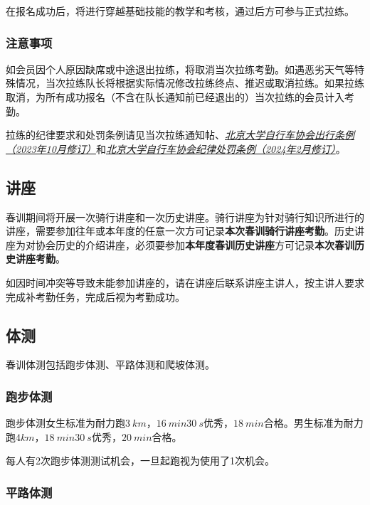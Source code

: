 \documentclass[UTF8]{ctexart}
\begin{document}
在报名成功后，将进行穿越基础技能的教学和考核，通过后方可参与正式拉练。

\subsubsection{注意事项}

如会员因个人原因缺席或中途退出拉练，将取消当次拉练考勤。如遇恶劣天气等特殊情况，当次拉练队长将根据实际情况修改拉练终点、推迟或取消拉练。如果拉练取消，为所有成功报名（不含在队长通知前已经退出的）当次拉练的会员计入考勤。


拉练的纪律要求和处罚条例请见当次拉练通知帖、\href{https://chexie.net/bbs/content/?bid=1&tid=9618&p=1}{\textit{北京大学自行车协会出行条例（2023年10月修订）}}和\href{https://chexie.net/bbs/content/?bid=1&tid=9751&p=1}{\textit{北京大学自行车协会纪律处罚条例（2024年2月修订）}}。

\subsection{讲座}


春训期间将开展一次骑行讲座和一次历史讲座。骑行讲座为针对骑行知识所进行的讲座，需要参加往年或本年度的任意一次方可记录\textbf{本次春训骑行讲座考勤}。历史讲座为对协会历史的介绍讲座，必须要参加\textbf{本年度春训历史讲座}方可记录\textbf{本次春训历史讲座考勤}。

如因时间冲突等导致未能参加讲座的，请在讲座后联系讲座主讲人，按主讲人要求完成补考勤任务，完成后视为考勤成功。

\subsection{体测}

春训体测包括跑步体测、平路体测和爬坡体测。

\subsubsection{跑步体测}

跑步体测女生标准为耐力跑$\SI{3}{km}$，$\SI{16}{min}\SI{30}{s}$优秀，$\SI{18}{min}$合格。男生标准为耐力跑$4km$，$\SI{18}{min}\SI{30}{s}$优秀，$\SI{20}{min}$合格。

每人有2次跑步体测测试机会，一旦起跑视为使用了1次机会。

\subsubsection{平路体测}
\end{document}
